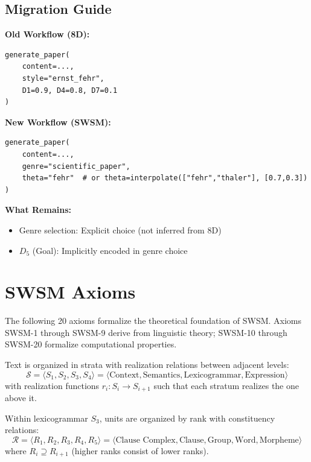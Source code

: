 \subsection{Migration Guide}
\label{sec:sw-migration}

\textbf{Old Workflow (8D):}
\begin{verbatim}
generate_paper(
    content=...,
    style="ernst_fehr",
    D1=0.9, D4=0.8, D7=0.1
)
\end{verbatim}

\textbf{New Workflow (SWSM):}
\begin{verbatim}
generate_paper(
    content=...,
    genre="scientific_paper",
    theta="fehr"  # or theta=interpolate(["fehr","thaler"], [0.7,0.3])
)
\end{verbatim}

\textbf{What Remains:}
\begin{itemize}
    \item Genre selection: Explicit choice (not inferred from 8D)
    \item $D_5$ (Goal): Implicitly encoded in genre choice
\end{itemize}


\section{SWSM Axioms}
\label{sec:sw-axioms}

The following 20 axioms formalize the theoretical foundation of SWSM. Axioms SWSM-1 through SWSM-9 derive from linguistic theory; SWSM-10 through SWSM-20 formalize computational properties.

\begin{axiom}
\label{ax:swsm-1}
Text is organized in strata with realization relations between adjacent levels:
\begin{equation}
\mathcal{S} = \langle S_1, S_2, S_3, S_4 \rangle = \langle \text{Context}, \text{Semantics}, \text{Lexicogrammar}, \text{Expression} \rangle
\end{equation}
with realization functions $r_{i}: S_i \rightarrow S_{i+1}$ such that each stratum realizes the one above it.
\end{axiom}

\begin{axiom}
\label{ax:swsm-2}
Within lexicogrammar $S_3$, units are organized by rank with constituency relations:
\begin{equation}
\mathcal{R} = \langle R_1, R_2, R_3, R_4, R_5 \rangle = \langle \text{Clause Complex}, \text{Clause}, \text{Group}, \text{Word}, \text{Morpheme} \rangle
\end{equation}
where $R_i \supseteq R_{i+1}$ (higher ranks consist of lower ranks).
\end{axiom}

